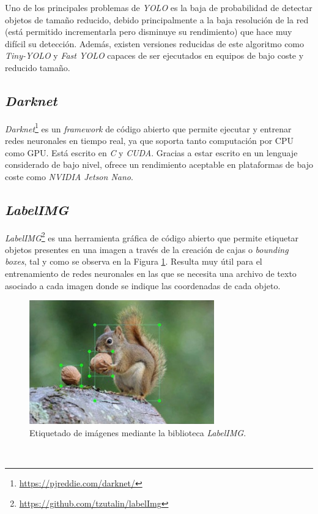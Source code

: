 Uno de los principales problemas de \textit{YOLO} es la baja de probabilidad de detectar objetos de tamaño reducido, debido principalmente a la baja resolución de la red (está permitido incrementarla pero disminuye su rendimiento) que hace muy difícil su detección. Además, existen versiones reducidas de este algoritmo como \textit{Tiny-YOLO} y \textit{Fast YOLO} capaces de ser ejecutados en equipos de bajo coste y reducido tamaño.\\

\subsection{\textit{Darknet}}
\label{subsection:darknet}
\textit{Darknet}\footnote{\url{https://pjreddie.com/darknet/}} es un \textit{framework} de código abierto que permite ejecutar y entrenar redes neuronales en tiempo real, ya que soporta tanto computación por CPU como GPU. Está escrito en \textit{C} y \textit{CUDA}. Gracias a estar escrito en un lenguaje considerado de bajo nivel, ofrece un rendimiento aceptable en plataformas de bajo coste como \textit{NVIDIA Jetson Nano}.\\

\subsection{\textit{LabelIMG}}
\textit{LabelIMG}\footnote{\url{https://github.com/tzutalin/labelImg}} es una herramienta gráfica de código abierto que permite etiquetar objetos presentes en una imagen a través de la creación de cajas o \textit{bounding boxes}, tal y como se observa en la Figura \ref{fig:labelimg}. Resulta muy útil para el entrenamiento de redes neuronales en las que se necesita una archivo de texto asociado a cada imagen donde se indique las coordenadas de cada objeto.\\

\begin{figure} [h!]
	\begin{center}
		\includegraphics[width=8cm]{figs/labelimg}
	\end{center}
	\caption{Etiquetado de imágenes mediante la biblioteca \textit{LabelIMG}.}
	\label{fig:labelimg}
\end{figure}\

